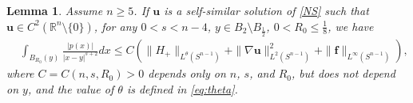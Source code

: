 \documentclass[12pt]{amsart}
\newtheorem{lemma}[theorem]{Lemma}
\newcommand{\Bu}{{\boldsymbol{u}}}
\newcommand{\Bf}{{\boldsymbol{f}}}
\begin{document}
	
	{
		\begin{lemma}\label{lem:weighedestiforpressure}
			Assume $n\geq 5$. If $\Bu$ is a self-similar solution of \eqref{NS} such that $\Bu \in C^2(\mathbb{R}^n \setminus\{0\})$, 
			for any $0<s<n-4$, $y \in B_2\setminus B_{\frac12}$, $0<R_0\leq \frac{1}{8}$, we have
			\begin{equation}\label{weightedestiforpressure-0}
				\begin{aligned}
					& \int_{B_{R_0}(y)} \frac{|p(x)|}{|x-y|^{s+2}} dx \leq C\left(\|H_{+}\|_{L^{\theta}(S^{n-1})} +	 \|\nabla \Bu\|_{L^2(S^{n-1}) }^2+ \|\Bf\|_{L^{\infty}(S^{n-1})}\right),
				\end{aligned}
			\end{equation}
			where $C=C( n,s, R_0) > 0$ depends only on $n$, $s$, and $R_{0}$, but does not depend on $y$,  and the value of  $\theta$  is defined in  \eqref{eq:theta}.
		\end{lemma}
		
}
\end{document}
